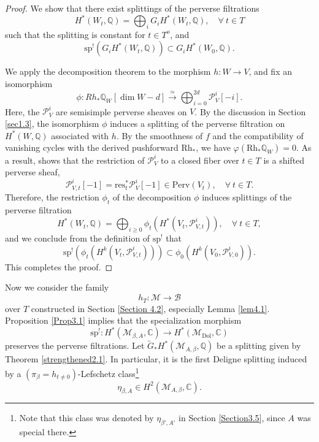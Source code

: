 \documentclass[11pt]{amsart}
\theoremstyle{plain}
\theoremstyle{definition}
\theoremstyle{remark}
\newcommand{\BC}{{\mathbb{C}}}
\newcommand{\BQ}{{\mathbb{Q}}}
\newcommand{\CB}{{\mathcal B}}
\newcommand{\CM}{{\mathcal M}}
\newcommand{\CP}{{\mathcal P}}
\begin{document}
\begin{proof}
We show that there exist splittings of the perverse filtrations
\[
H^*(W_t, \BQ) = \bigoplus_{i}G_iH^*(W_t, \BQ), \quad \forall~ t \in T
\]
such that the splitting is constant for $t \in T^o$, and
\begin{equation*}
\mathrm{sp}^!\left(G_iH^*(W_t ,\BQ)\right) \subset G_iH^*(W_0, \BQ).
\end{equation*}




We apply the decomposition theorem \cite{BBD} to the morphism $h: W \to V$, and fix an isomorphism
\[
\phi: Rh_\ast \BQ_W [\dim{W} - d] \xrightarrow{\simeq} \bigoplus_{i=0}^{2d} \CP_V^i [-i].
\]
Here, the $\CP_V^i$ are semisimple perverse sheaves on $V$. By the discussion in Section \ref{sec1.3}, the isomorphism $\phi$ induces a splitting of the perverse filtration on $H^*(W, \BQ)$ associated with $h$. By the smoothness of $f$ and the compatibility of vanishing cycles with the derived pushforward $\mathrm{Rh}_*$, we have $\varphi(\mathrm{Rh}_\ast \BQ_W) = 0$.  As a result, \cite[Corollary 3.1.6]{dCM} shows that the restriction of $\CP_V^i$ to a closed fiber over $t\in T$ is a shifted perverse sheaf,
\[
\CP_{V,t}^i [-1] = \mathrm{res}_t^*\CP_V^i [-1] \in \mathrm{Perv}(V_t), \quad \forall~ t\in T.
\]
Therefore, the restriction $\phi_t$ of the decomposition $\phi$ induces  splittings of the perverse filtration
\[
H^*(W_t, \BQ) = \bigoplus_{i \geq 0} \phi_t (H^*(V_t, \CP_{V,t}^i)), \quad \forall~ t\in T,
\]
and we conclude from the definition of $\mathrm{sp}^!$ that
\[
\mathrm{sp}^! \left(\phi_t(H^k(V_t, \CP_{V,t}^i))\right) \subset \phi_0(H^k(V_0, \CP_{V,0}^i)).
\]
This completes the proof.
\end{proof}

Now we consider the family
\[
h_T: \CM \to  \CB
\]
over $T$ constructed in Section \ref{Section 4.2}, especially Lemma \ref{lem4.1}. Proposition \ref{Prop3.1} implies that the specialization morphism
\[
\mathrm{sp}^!: H^*(\CM_{\beta, A}, \BC) \to H^*(\CM_{\mathrm{Dol}}, \BC)
\]
preserves the perverse filtrations. Let $\widetilde{G}_*H^*(\CM_{A,\beta}, \BQ)$ be a splitting given by Theorem \ref{strengthened2.1}. In particular,  it is the first Deligne splitting induced by a  { $(\pi_\beta=h_{t\neq 0})$-}Lefschetz class\footnote{Note that this class was denoted by $\eta_{\beta',A'}$ in Section \ref{Section3.5}, since $A$ was special there.}
\[
\eta_{\beta,A} \in H^2(\CM_{A,\beta}, \BC).
\]
\end{document}
